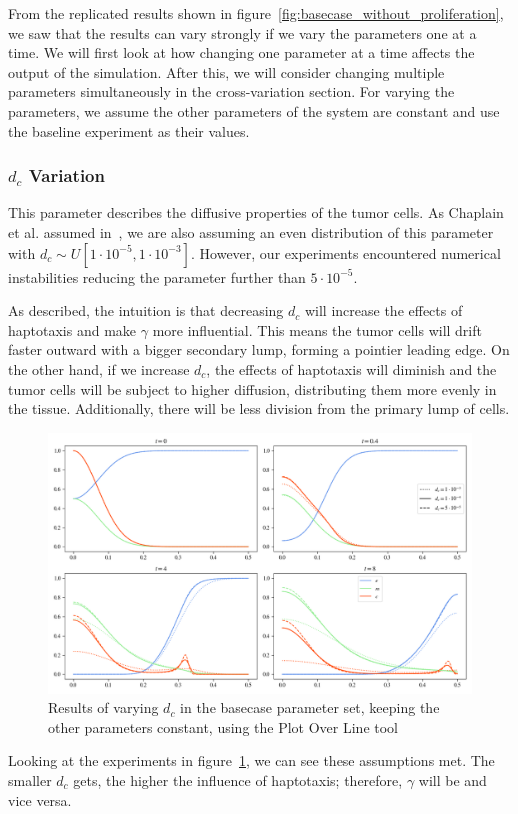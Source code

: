 From the replicated results shown in figure~\ref{fig:basecase_without_proliferation}, we saw that the results can vary strongly if we vary the parameters one at a time. We will first look at how changing one parameter at a time affects the output of the simulation. After this, we will consider changing multiple parameters simultaneously in the cross-variation section. For varying the parameters, we assume the other parameters of the system are constant and use the baseline experiment as their values.

\subsubsection*{$d_c$ Variation}
This parameter describes the diffusive properties of the tumor cells. As Chaplain et al. assumed in~\cite{STEPHANOU200696}, we are also assuming an even distribution of this parameter with $d_c \sim U[1\cdot 10^{-5}, 1\cdot 10^{-3}]$. However, our experiments encountered numerical instabilities reducing the parameter further than $5 \cdot 10^{-5}$. 

As described, the intuition is that decreasing $d_c$ will increase the effects of haptotaxis and make $\gamma$ more influential. This means the tumor cells will drift faster outward with a bigger secondary lump, forming a pointier leading edge. On the other hand, if we increase $d_c$, the effects of haptotaxis will diminish and the tumor cells will be subject to higher diffusion, distributing them more evenly in the tissue. Additionally, there will be less division from the primary lump of cells. 
\begin{figure}[h!]
 \centering
 \includegraphics[width=\textwidth]{resources/images/dc_variation.png}
 \caption{Results of varying $d_c$ in the basecase parameter set, keeping the other parameters constant, using the Plot Over Line tool}
 \label{fig:dc_variation}
\end{figure}
Looking at the experiments in figure~\ref{fig:dc_variation}, we can see these assumptions met. The smaller $d_c$ gets, the higher the influence of haptotaxis; therefore, $\gamma$ will be and vice versa.

